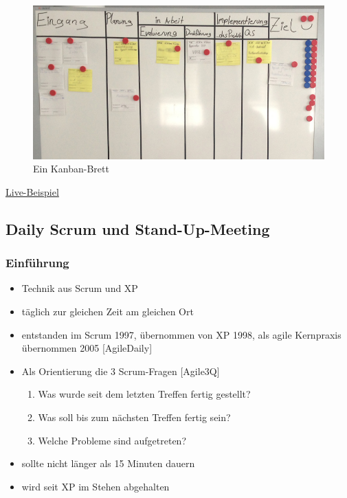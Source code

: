 \documentclass[%
	handout
]{beamer}
\newcommand{\daily}{[AgileDaily]}
\newcommand{\tq}{[Agile3Q]}
\begin{document}
		\begin{frame}
			\begin{figure}[h]
				\begin{center}
					\includegraphics[scale=.3]{../images/kanban-board.jpg}
					\caption{Ein Kanban-Brett}
					\label{img:kanban}
				\end{center}
			\end{figure}
		\end{frame}
		
		\begin{frame}
			\href{http://www.kanbansim.org/boards/3a5a5acdb1c24535e9962dd20fe434b3}{Live-Beispiel}
		\end{frame}
		
	\subsection{Daily Scrum und Stand-Up-Meeting}
		\begin{frame}
			\frametitle{Einführung}
			\begin{itemize}
				\item Technik aus Scrum und XP\pause
				\item täglich zur gleichen Zeit am gleichen Ort\pause
				\item entstanden im Scrum 1997, übernommen von XP 1998, als agile Kernpraxis übernommen 2005 \daily\pause
				\item Als Orientierung die 3 Scrum-Fragen \tq
				\begin{enumerate}
					\item Was wurde seit dem letzten Treffen fertig gestellt?
					\item Was soll bis zum nächsten Treffen fertig sein?
					\item Welche Probleme sind aufgetreten?
				\end{enumerate}\pause
				\item sollte nicht länger als 15 Minuten dauern\pause
				\item wird seit XP im Stehen abgehalten
			\end{itemize}
		\end{frame}
		
\end{document}
